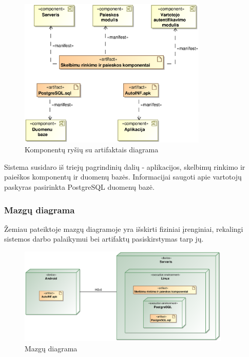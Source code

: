 \documentclass[12pt]{article}
\begin{document}
	\begin{figure}[h]
		\begin{center}
			\includegraphics[width=0.8\textwidth]{ArtifaktaiKomponentai.eps}
			\caption{Komponentų ryšių su artifaktais diagrama\label{ArtComp}}
		\end{center}
	\end{figure}

	Sistema susidaro iš triejų pagrindinių dalių - aplikacijos, skelbimų rinkimo ir paieškos komponentų ir duomenų bazės. Informacijai saugoti apie vartotojų paskyras pasirinkta PostgreSQL duomenų bazė.
	\pagebreak
	
	\subsubsection{Mazgų diagrama}
	
	Žemiau pateiktoje mazgų diagramoje yra išskirti fiziniai įrenginiai, rekalingi sistemos darbo palaikymui bei artifaktų pasiskirstymas tarp jų.\\
	
	\begin{figure}[h]
		\begin{center}
			\includegraphics[width=0.9\textwidth]{Mazgai.eps}
			\caption{Mazgų diagrama\label{Cube}}
		\end{center}
	\end{figure}
	
\end{document}
